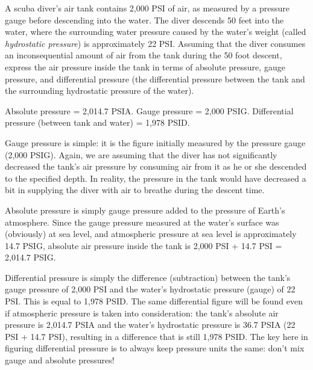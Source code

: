 

A scuba diver's air tank contains 2,000 PSI of air, as measured by a pressure gauge before descending into the water.  The diver descends 50 feet into the water, where the surrounding water pressure caused by the water's weight (called {\it hydrostatic pressure}) is approximately 22 PSI.  Assuming that the diver consumes an inconsequential amount of air from the tank during the 50 foot descent, express the air pressure inside the tank in terms of absolute pressure, gauge pressure, and differential pressure (the differential pressure between the tank and the surrounding hydrostatic pressure of the water).







Absolute pressure = 2,014.7 PSIA.  Gauge pressure = 2,000 PSIG.  Differential pressure (between tank and water) = 1,978 PSID.

\vskip 10pt

Gauge pressure is simple: it is the figure initially measured by the pressure gauge (2,000 PSIG).  Again, we are assuming that the diver has not significantly decreased the tank's air pressure by consuming air from it as he or she descended to the specified depth.  In reality, the pressure in the tank would have decreased a bit in supplying the diver with air to breathe during the descent time.

Absolute pressure is simply gauge pressure added to the pressure of Earth's atmosphere.  Since the gauge pressure measured at the water's surface was (obviously) at sea level, and atmospheric pressure at sea level is approximately 14.7 PSIG, absolute air pressure inside the tank is 2,000 PSI + 14.7 PSI = 2,014.7 PSIG.

Differential pressure is simply the difference (subtraction) between the tank's gauge pressure of 2,000 PSI and the water's hydrostatic pressure (gauge) of 22 PSI.  This is equal to 1,978 PSID.  The same differential figure will be found even if atmospheric pressure is taken into consideration: the tank's absolute air pressure is 2,014.7 PSIA and the water's hydrostatic pressure is 36.7 PSIA (22 PSI + 14.7 PSI), resulting in a difference that is still 1,978 PSID.  The key here in figuring differential pressure is to always keep pressure units the same: don't mix gauge and absolute pressures!










